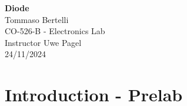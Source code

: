 \documentclass{article}
\begin{document}
	
	\mbox{}
	\vspace{10cm}
	\begin{center}
		 \textbf{\Huge{Diode}}\\
		 \bigskip
		 \Large{Tommaso Bertelli}\\
		 \bigskip
		 \Large{CO-526-B - Electronics Lab}\\
		 \bigskip
		 \Large{Instructor Uwe Pagel}\\
		 \bigskip
		 \Large{24/11/2024}\\
	\end{center}
	
	
	\pagebreak
	\section{Introduction - Prelab}
\end{document}
